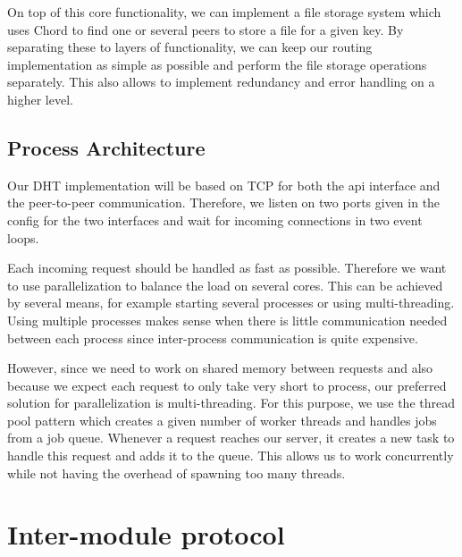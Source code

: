 \documentclass[a4paper, 11pt]{article}
\begin{document}
On top of this core functionality, we can implement a file storage system which uses Chord to find one or several peers to store a file for a given key. By separating these to layers of functionality, we can keep our routing implementation as simple as possible and perform the file storage operations separately. This also allows to implement redundancy and error handling on a higher level.

\subsection{Process Architecture}

Our DHT implementation will be based on TCP for both the api interface and the peer-to-peer communication. Therefore, we listen on two ports given in the config for the two interfaces and wait for incoming connections in two event loops.

Each incoming request should be handled as fast as possible. Therefore we want to use parallelization to balance the load on several cores. This can be achieved by several means, for example starting several processes or using multi-threading.
Using multiple processes makes sense when there is little communication needed between each process since inter-process communication is quite expensive.

However, since we need to work on shared memory between requests and also because we expect each request to only take very short to process, our preferred solution for parallelization is multi-threading. For this purpose, we use the thread pool pattern which creates a given number of worker threads and handles jobs from a job queue. Whenever a request reaches our server, it creates a new task to handle this request and adds it to the queue. This allows us to work concurrently while not having the overhead of spawning too many threads.




\section{Inter-module protocol}

\end{document}
